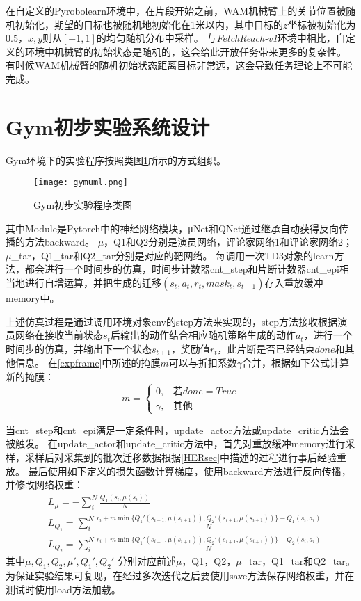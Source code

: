 在自定义的Pyrobolearn环境中，在片段开始之前，WAM机械臂上的关节位置被随机初始化，期望的目标也被随机地初始化在1米以内，其中目标的$z$坐标被初始化为0.5，$x,y$则从$[-1,1]$的均匀随机分布中采样。
与\emph{FetchReach-v1}环境中相比，自定义的环境中机械臂的初始状态是随机的，这会给此开放任务带来更多的复杂性。
有时候WAM机械臂的随机初始状态距离目标非常远，这会导致任务理论上不可能完成。

\section{Gym初步实验系统设计}\label{gymexp}

Gym环境下的实验程序按照类图\ref{gymuml}所示的方式组织。
    \begin{figure}[htpb]
        \centering
        \texttt{[image: gymuml.png]}
        \caption{Gym初步实验程序类图}
        \label{gymuml}
    \end{figure}
其中Module是Pytorch中的神经网络模块，μNet和QNet通过继承自动获得反向传播的方法backward。
$\mu$，Q1和Q2分别是演员网络，评论家网络1和评论家网络2；$\mu$\_tar，Q1\_tar和Q2\_tar分别是对应的靶网络。
每调用一次TD3对象的learn方法，都会进行一个时间步的仿真，时间步计数器cnt\_step和片断计数器cnt\_epi相当地进行自增运算，并把生成的迁移$(s_t,a_t,r_t,mask_t,s_{t+1})$存入重放缓冲memory中。

上述仿真过程是通过调用环境对象env的step方法来实现的，step方法接收根据演员网络在接收当前状态$s_t$后输出的动作结合相应随机策略生成的动作$a_t$，进行一个时间步的仿真，并输出下一个状态$s_{t+1}$，奖励值$r_t$，此片断是否已经结束$done$和其他信息。
在\ref{expframe}中所述的掩膜$m$可以与折扣系数$\gamma$合并，根据如下公式计算新的掩膜：
\[
m=\begin{cases}
          0, & \text{若} done=True \\
          \gamma, & \text{其他}
\end{cases}
\]

当cnt\_step和cnt\_epi满足一定条件时，update\_actor方法或update\_critic方法会被触发。
在update\_actor和update\_critic方法中，首先对重放缓冲memory进行采样，采样后对采集到的批次迁移数据根据\ref{HERsec}中描述的过程进行事后经验重放。
最后使用如下定义的损失函数计算梯度，使用backward方法进行反向传播，并修改网络权重：
\begin{align}
    & L_\mu = -\sum_i^N\frac{Q_1(s_i, \mu(s_i))}{N} \\
    & L_{Q_1} = \sum_i^N\frac{r_i + m \min\{Q_1'(s_{i+1},\mu(s_{i+1})), Q_2'(s_{i+1},\mu(s_{i+1}))\} - Q_1(s_i,a_i)}{N}\\
    & L_{Q_2} = \sum_i^N\frac{r_i + m \min\{Q_1'(s_{i+1},\mu(s_{i+1})), Q_2'(s_{i+1},\mu(s_{i+1}))\} - Q_2(s_i,a_i)}{N}
\end{align}
其中$\mu, Q_1, Q_2, \mu', Q_1',Q_2'$ 分别对应前述$\mu$，Q1，Q2，$\mu$\_tar，Q1\_tar和Q2\_tar。
为保证实验结果可复现，在经过多次迭代之后要使用save方法保存网络权重，并在测试时使用load方法加载。

